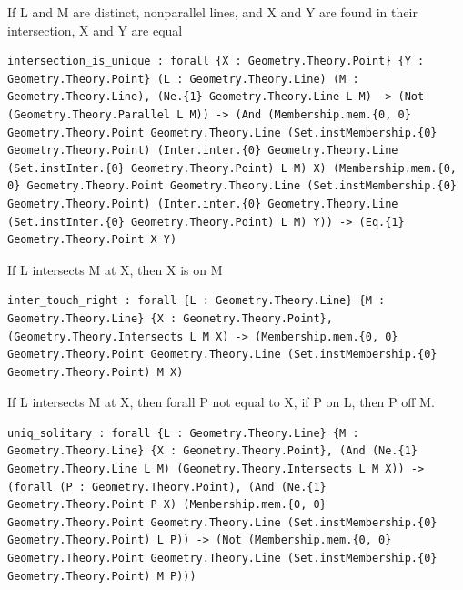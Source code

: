 \begin{theorem}
  \label{Geometry.Theory.Intersection.intersection_is_unique}
  \leanok
  If L and M are distinct, nonparallel lines, and X and Y are found in their intersection, X and Y are equal 
\begin{verbatim}intersection_is_unique : forall {X : Geometry.Theory.Point} {Y : Geometry.Theory.Point} (L : Geometry.Theory.Line) (M : Geometry.Theory.Line), (Ne.{1} Geometry.Theory.Line L M) -> (Not (Geometry.Theory.Parallel L M)) -> (And (Membership.mem.{0, 0} Geometry.Theory.Point Geometry.Theory.Line (Set.instMembership.{0} Geometry.Theory.Point) (Inter.inter.{0} Geometry.Theory.Line (Set.instInter.{0} Geometry.Theory.Point) L M) X) (Membership.mem.{0, 0} Geometry.Theory.Point Geometry.Theory.Line (Set.instMembership.{0} Geometry.Theory.Point) (Inter.inter.{0} Geometry.Theory.Line (Set.instInter.{0} Geometry.Theory.Point) L M) Y)) -> (Eq.{1} Geometry.Theory.Point X Y)\end{verbatim}
\end{theorem}

\begin{theorem}
  \label{Geometry.Theory.Intersection.inter_touch_right}
  \leanok
  If L intersects M at X, then X is on M 
\begin{verbatim}inter_touch_right : forall {L : Geometry.Theory.Line} {M : Geometry.Theory.Line} {X : Geometry.Theory.Point}, (Geometry.Theory.Intersects L M X) -> (Membership.mem.{0, 0} Geometry.Theory.Point Geometry.Theory.Line (Set.instMembership.{0} Geometry.Theory.Point) M X)\end{verbatim}
\end{theorem}

\begin{theorem}
  \label{Geometry.Theory.Intersection.uniq_solitary}
  \leanok
  If L intersects M at X, then forall P not equal to X, if P on L, then P off M. 
\begin{verbatim}uniq_solitary : forall {L : Geometry.Theory.Line} {M : Geometry.Theory.Line} {X : Geometry.Theory.Point}, (And (Ne.{1} Geometry.Theory.Line L M) (Geometry.Theory.Intersects L M X)) -> (forall (P : Geometry.Theory.Point), (And (Ne.{1} Geometry.Theory.Point P X) (Membership.mem.{0, 0} Geometry.Theory.Point Geometry.Theory.Line (Set.instMembership.{0} Geometry.Theory.Point) L P)) -> (Not (Membership.mem.{0, 0} Geometry.Theory.Point Geometry.Theory.Line (Set.instMembership.{0} Geometry.Theory.Point) M P)))\end{verbatim}
\end{theorem}

